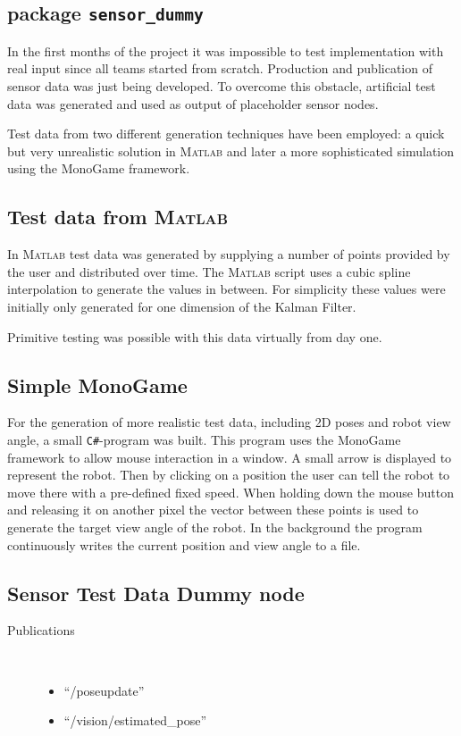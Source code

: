 \subsection{package \texttt{sensor\_dummy}}
In the first months of the project it was impossible to test implementation with real input since all teams started from scratch. Production and publication of sensor data was just being developed. To overcome this obstacle, artificial test data was generated and used as output of placeholder sensor nodes. 

Test data from two different generation techniques have been employed: a quick but very unrealistic solution in \textsc{Matlab} and later a more sophisticated simulation using the MonoGame framework.

\subsection{Test data from \textsc{Matlab}}
In \textsc{Matlab} test data was generated by supplying a number of points provided by the user and distributed over time. The \textsc{Matlab} script uses a cubic spline interpolation to generate the values in between. For simplicity these values were initially only generated for one dimension of the Kalman Filter.

Primitive testing was possible with this data virtually from day one.

\subsection{Simple MonoGame}
For the generation of more realistic test data, including 2D poses and robot view angle, a small \texttt{C\#}-program was built. This program uses the MonoGame framework to allow mouse interaction in a window. A small arrow is displayed to represent the robot. Then by clicking on a position the user can tell the robot to move there with a pre-defined fixed speed. When holding down the mouse button and releasing it on another pixel the vector between these points is used to generate the target view angle of the robot. In the background the program continuously writes the current position and view angle to a file.

\subsection{Sensor Test Data Dummy node}
\begin{description}
\item[Publications]\
	\begin{itemize}
	\item ``/poseupdate''
	\item ``/vision/estimated\_pose''
	\end{itemize}
\end{description}

